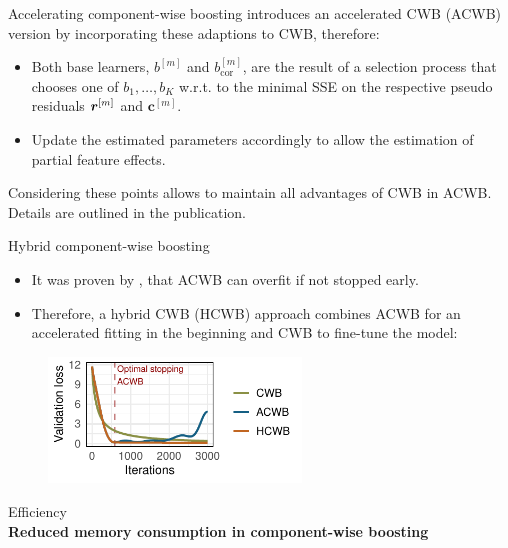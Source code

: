\documentclass[t,10pt]{beamer}
\newcommand{\fSlide}[2]{
\begin{frame}[plain]{}%
  \vspace{4cm}%
  \Large #1\\[0.2cm]%
  {\LARGE\textbf{#2}}%
	\addtocounter{framenumber}{-1}%
\end{frame}%
}
\begin{document}
\begin{frame}{Accelerating component-wise boosting}
  \citet{schalk2022accelerated} introduces an accelerated CWB (ACWB)
  version by incorporating these adaptions to CWB, therefore:

  \begin{itemize}
    \item
      Both base learners, \(b^{[m]}\) and \(b^{[m]}_{\text{cor}}\), are the
      result of a selection process that chooses one of \(b_1, \dots, b_K\)
      w.r.t. to the minimal SSE on the respective pseudo residuals \(\bm{r}^{[m]}\)
      and \(\bm{c}^{[m]}\).
    \item
      Update the estimated parameters accordingly to allow the estimation of
      partial feature effects.
  \end{itemize}
  Considering these points allows to maintain all advantages of CWB in
  ACWB. Details are outlined in the publication.
\end{frame}

\begin{frame}{Hybrid component-wise boosting}
  \begin{itemize}
    \item
      It was proven by \citet{lu2020accelerating}, that ACWB can overfit if
      not stopped early.
    \item
      Therefore, a hybrid CWB (HCWB) approach combines ACWB for an accelerated fitting in the beginning and CWB
      to fine-tune the model:
  \end{itemize}

  \begin{figure}
    \centering
    \includegraphics[width=0.6\textwidth]{figures/fig-HCWB.pdf}
  \end{figure}
\end{frame}

\fSlide{Efficiency}{Reduced memory consumption in component-wise boosting}
\end{document}
